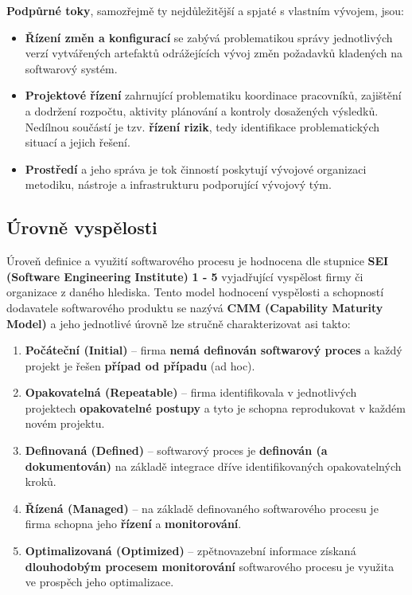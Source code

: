 \noindent\textbf{Podpůrné toky}, samozřejmě ty nejdůležitější a spjaté s vlastním vývojem, jsou:
\begin{itemize}
\item \textbf{Řízení změn a konfigurací} se zabývá problematikou správy jednotlivých verzí vytvářených artefaktů odrážejících vývoj změn požadavků kladených na softwarový systém.
\item \textbf{Projektové řízení} zahrnující problematiku koordinace pracovníků, zajištění a dodržení rozpočtu, aktivity plánování a kontroly dosažených výsledků.  Nedílnou součástí je tzv. \textbf{řízení rizik}, tedy identifikace problematických situací a jejich řešení.
\item \textbf{Prostředí} a jeho správa je tok činností poskytují vývojové organizaci metodiku, nástroje a infrastrukturu podporující vývojový tým.
\end{itemize}

\subsection{Úrovně vyspělosti}
Úroveň definice a využití softwarového procesu je hodnocena dle stupnice \textbf{SEI (Software Engineering Institute)} \textbf{1 - 5} vyjadřující vyspělost firmy či organizace z daného hlediska. Tento model hodnocení vyspělosti a schopností dodavatele softwarového produktu se nazývá \textbf{CMM (Capability Maturity Model)} a jeho jednotlivé úrovně lze stručně charakterizovat asi takto:

\begin{enumerate}
	\item \textbf{Počáteční (Initial)} -- firma \textbf{nemá definován softwarový proces} a každý projekt je řešen \textbf{případ od případu} (ad hoc).
	\item \textbf{Opakovatelná (Repeatable)} -- firma identifikovala v jednotlivých projektech \textbf{opakovatelné postupy} a tyto je schopna reprodukovat v každém novém projektu.
	\item \textbf{Definovaná (Defined)} -- softwarový proces je \textbf{definován (a dokumentován)} na základě integrace dříve identifikovaných opakovatelných kroků.
	\item \textbf{Řízená (Managed)} -- na základě definovaného softwarového procesu je firma schopna jeho \textbf{řízení} a \textbf{monitorování}.
	\item \textbf{Optimalizovaná (Optimized)} -- zpětnovazební informace získaná \textbf{dlouhodobým procesem monitorování} softwarového procesu je využita ve prospěch jeho optimalizace.
\end{enumerate}

